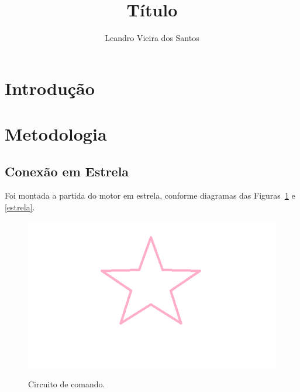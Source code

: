 \documentclass[twocolumn]{article}
\title{Título}
\author{Leandro Vieira dos Santos}
\affil{EREM Regina Pacis\\Palmerina-PE}
\begin{document}
\maketitle        

\begin{abstract}
\lipsum[1]
\end{abstract}

\section{Introdução}

\lipsum[1-2]

\section{Metodologia}

\lipsum[3-6]

\subsection{Conexão em Estrela}\label{sec_estrela}
Foi montada a partida do motor em estrela, conforme diagramas das Figuras~\ref{comando} e \ref{estrela}.

\begin{figure}[!htb]
	\centering\includegraphics[width=\columnwidth]{diagrama_estrela}\\
	\caption{Circuito de comando. }\label{comando}
\end{figure}
\end{document}

